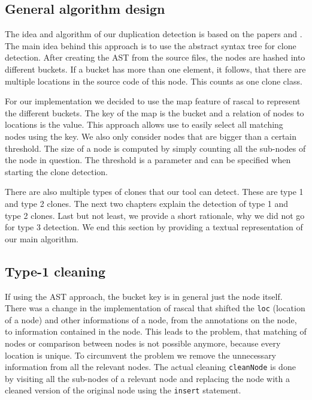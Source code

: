 \documentclass{uva-inf-article}
\begin{document}
\subsection{General algorithm design}

The idea and algorithm of our duplication detection is based on the
papers \cite{lazar2014clone} and \cite{baxter1998clone}. 
The main idea behind this approach is to use the abstract syntax tree for clone detection.
After creating the AST from the source files, the nodes are hashed into different buckets.
If a bucket has more than one element, it follows, that there are multiple locations in the source code of this node.
This counts as one clone class. 

For our implementation we decided to use the map feature of rascal to represent the different buckets. The key of the map is the bucket and a relation of nodes to locations is the value. This approach allows use to easily select all matching nodes using the key.  We also only consider nodes that are bigger than a certain threshold. The size of a node is computed by simply counting all the sub-nodes of the node in question. The threshold is a parameter and can be specified when starting the clone detection.

There are also multiple types of clones that our tool can detect. These are type 1 and type 2 clones. The next two chapters explain the detection of type 1 and type 2 clones. Last but not least, we provide a short rationale, why we did not go for type 3 detection. We end this section by providing a textual representation of our main algorithm.

\subsection{Type-1 cleaning}

If using the AST approach, the bucket key is in general just the node itself. There was a change in the implementation of rascal that shifted the \texttt{loc} (location of a node) and other informations of a node, from the annotations on the node, to information contained in the node. This leads to the problem, that matching of nodes or comparison between nodes is not possible anymore, because every location is unique. To circumvent the problem we remove the unnecessary information from all the relevant nodes. The actual cleaning \texttt{cleanNode} is done by visiting all the sub-nodes of a relevant node and replacing the node with a cleaned version of the original node using the \texttt{insert} statement.
\end{document}
